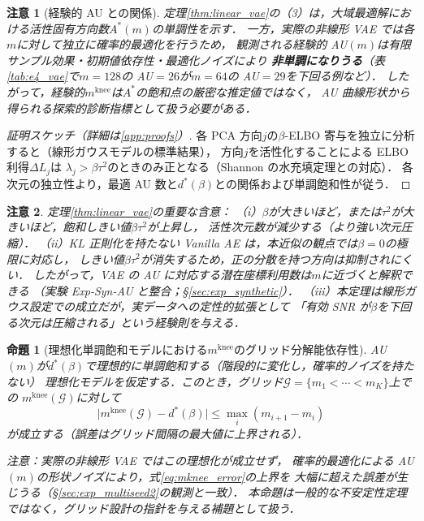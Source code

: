 \documentclass[11pt,a4paper]{jsarticle}
\newtheorem{proposition}{命題}
\newtheorem{remark}{注意}
\newcommand{\mknee}{m^{\mathrm{knee}}}
\begin{document}
\begin{remark}[経験的 AU との関係]
定理\ref{thm:linear_vae}の（3）は，大域最適解における活性固有方向数$A^*(m)$の単調性を示す．
一方，実際の非線形 VAE では各$m$に対して独立に確率的最適化を行うため，
観測される経験的 AU$(m)$は有限サンプル効果・初期値依存性・最適化ノイズにより
\textbf{非単調になりうる}（表\ref{tab:e4_vae}で$m=128$の AU$=26$が$m=64$の AU$=29$を下回る例など）．
したがって，経験的$\mknee$は$A^*$の飽和点の厳密な推定値ではなく，
AU 曲線形状から得られる探索的診断指標として扱う必要がある．
\end{remark}

\begin{proof}[証明スケッチ（詳細は\ref{app:proofs}）]
各 PCA 方向$j$の$\beta$-ELBO 寄与を独立に分析すると（線形ガウスモデルの標準結果），
方向$j$を活性化することによる ELBO 利得$\Delta L_j$は
$\lambda_j > \beta\tau^2$のときのみ正となる（Shannon の水充填定理との対応）．
各次元の独立性より，最適 AU 数と$d^*(\beta)$との関係および単調飽和性が従う．
\end{proof}

\begin{remark}
定理\ref{thm:linear_vae}の重要な含意：
（i）$\beta$が大きいほど，または$\tau^2$が大きいほど，飽和しきい値$\beta\tau^2$が上昇し，
活性次元数が減少する（より強い次元圧縮）．
（ii）KL 正則化を持たない Vanilla AE は，本近似の観点では$\beta = 0$の極限に対応し，
しきい値$\beta\tau^2$が消失するため，正の分散を持つ方向は抑制されにくい．
したがって，VAE の AU に対応する潜在座標利用数は$m$に近づくと解釈できる
（実験 Exp-Syn-AU と整合；§\ref{sec:exp_synthetic}）．
（iii）本定理は線形ガウス設定での成立だが，実データへの定性的拡張として
「有効 SNR が$\beta$を下回る次元は圧縮される」という経験則を与える．
\end{remark}

\begin{proposition}[理想化単調飽和モデルにおける$\mknee$のグリッド分解能依存性]\label{thm:mknee_instab}
AU$(m)$が$d^*(\beta)$で理想的に単調飽和する（階段的に変化し，確率的ノイズを持たない）
理想化モデルを仮定する．このとき，グリッド$\mathcal{G} = \{m_1 < \cdots < m_K\}$上での
$\mknee(\mathcal{G})$に対して
\begin{equation}
  \bigl|\mknee(\mathcal{G}) - d^*(\beta)\bigr|
  \leq \max_{i} (m_{i+1} - m_i)
  \label{eq:mknee_error}
\end{equation}
が成立する（誤差はグリッド間隔の最大値に上界される）．

\noindent\textit{注意：実際の非線形 VAE ではこの理想化が成立せず，
確率的最適化による AU$(m)$の形状ノイズにより，式\eqref{eq:mknee_error}の上界を
大幅に超えた誤差が生じうる（§\ref{sec:exp_multiseed2}の観測と一致）．
本命題は一般的な不安定性定理ではなく，グリッド設計の指針を与える補題として扱う．}
\end{proposition}
\end{document}
